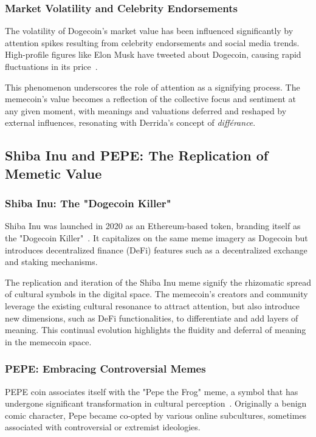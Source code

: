 \documentclass[a4paper,12pt]{article}
\begin{document}
\subsubsection{Market Volatility and Celebrity Endorsements}

The volatility of Dogecoin's market value has been influenced significantly by attention spikes resulting from celebrity endorsements and social media trends. High-profile figures like Elon Musk have tweeted about Dogecoin, causing rapid fluctuations in its price~\cite{pan2021elon}.

This phenomenon underscores the role of attention as a signifying process. The memecoin's value becomes a reflection of the collective focus and sentiment at any given moment, with meanings and valuations deferred and reshaped by external influences, resonating with Derrida's concept of \textit{différance}.

\subsection{Shiba Inu and PEPE: The Replication of Memetic Value}

\subsubsection{Shiba Inu: The "Dogecoin Killer"}

Shiba Inu was launched in 2020 as an Ethereum-based token, branding itself as the "Dogecoin Killer"~\cite{buterin2021shiba}. It capitalizes on the same meme imagery as Dogecoin but introduces decentralized finance (DeFi) features such as a decentralized exchange and staking mechanisms.

The replication and iteration of the Shiba Inu meme signify the rhizomatic spread of cultural symbols in the digital space. The memecoin's creators and community leverage the existing cultural resonance to attract attention, but also introduce new dimensions, such as DeFi functionalities, to differentiate and add layers of meaning. This continual evolution highlights the fluidity and deferral of meaning in the memecoin space.

\subsubsection{PEPE: Embracing Controversial Memes}

PEPE coin associates itself with the "Pepe the Frog" meme, a symbol that has undergone significant transformation in cultural perception~\cite{allen2017pepe}. Originally a benign comic character, Pepe became co-opted by various online subcultures, sometimes associated with controversial or extremist ideologies.
\end{document}
